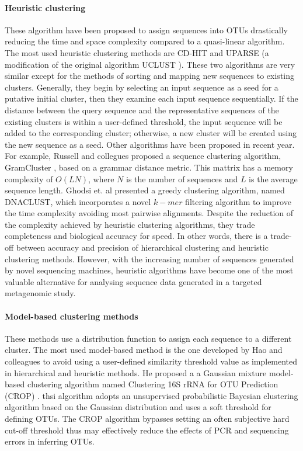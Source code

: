 \paragraph{Heuristic clustering}
These algorithm have been proposed to assign sequences into OTUs drastically reducing the time and space complexity compared to a quasi-linear algorithm. The most used heuristic clustering methods are CD-HIT \cite{li2006cd} and UPARSE \cite{edgar2013uparse} (a modification of the original algorithm UCLUST \cite{edgar2010search}). These two algorithms are very similar except for the methods of sorting and mapping new sequences to existing clusters. Generally, they begin by selecting an input sequence as a seed for a putative initial cluster, then they examine each input sequence sequentially. If the distance between the query sequence and the representative sequences of the existing clusters is within a user-defined threshold, the input sequence will be added to the corresponding cluster; otherwise, a new cluster will be created using the new sequence as a seed. Other algorithms have been proposed in recent year. For example, Russell and collegues proposed a sequence clustering algorithm, GramCluster \cite{russell2010grammar}, based on a grammar distance metric. This mattrix has a memory complexity of $O(LN)$, where $N$ is the number of sequences and $L$ is the average sequence length. Ghodsi et. al \cite{ghodsi2011dnaclust} presented a greedy clustering algorithm, named DNACLUST, which incorporates a novel $k-mer$ filtering algorithm to improve the time complexity avoiding most pairwise alignments. Despite the reduction of the complexity achieved by heuristic clustering algorithms, they trade completeness and biological accuracy for speed. In other words, there is a trade-off between accuracy and precision of hierarchical clustering and heuristic clustering methods. However, with the increasing number of sequences generated by novel sequencing machines, heuristic algorithms have become one of the most valuable alternative for analysing sequence data generated in a targeted metagenomic study.

\paragraph{Model-based clustering methods}
These methods use a distribution function to assign each sequence to a different cluster. The most used model-based method is the one developed by Hao and colleagues to avoid using a user-defined similarity threshold value as implemented in hierarchical and heuristic methods. He proposed a a Gaussian mixture model-based clustering algorithm named Clustering 16S rRNA for OTU Prediction (CROP) \cite{hao2011clustering}.  thsi algorithm adopts an unsupervised probabilistic Bayesian clustering algorithm based on the Gaussian distribution and uses a soft threshold for defining OTUs. The CROP algorithm bypasses setting an often subjective hard cut-off threshold thus may effectively reduce the effects of PCR and sequencing errors in inferring OTUs.

